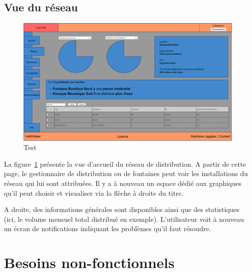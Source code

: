 \documentclass[a4paper, 11pt]{article}
\begin{document}
  \subsection{Vue du réseau}
    \begin{figure}[H]
        \includegraphics[width=\textwidth]{Cahier_des_Charges/reseau}
        \caption{Test}
        \label{fig:network}
    \end{figure}
    La figure~\ref{fig:network} présente la vue d'accueil du réseau de distribution. A partir de cette page, le gestionnaire de distribution ou de fontaines peut voir les installations du réseau qui lui sont attribuées. Il y a à nouveau un espace dédié aux graphiques qu'il peut choisir et visualiser via la flèche à droite du titre.

    A droite, des informations générales sont disponibles ainsi que des statistiques (ici, le volume mensuel total distribué en exemple).
    L'utilisateur voit à nouveau un écran de notifications indiquant les problèmes qu'il faut résoudre.

\section{Besoins non-fonctionnels}
\end{document}
